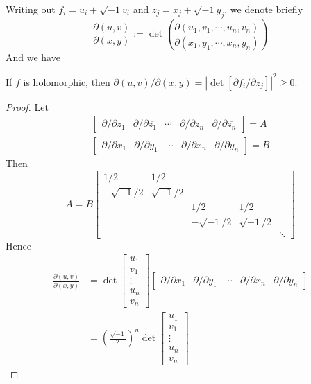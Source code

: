 Writing out $f_i=u_i+\sqrt{-1}v_i$ and $z_j=x_j+\sqrt{-1}y_j$, we denote briefly
\[\frac{\partial(u,v)}{\partial(x,y)}:=\det\left(\frac{\partial(u_1,v_1,\cdots,u_n,v_n)}{\partial(x_1,y_1,\cdots,x_n,y_n)}\right)\]
And we have
\begin{lem}\label{real jacobian}
    If $f$ is holomorphic, then $\partial(u,v)/\partial(x,y)=|\det[\partial{f_i}/\partial{z_j}]|^2\geq 0$.
\end{lem}
\begin{proof}
    Let
    \begin{gather*}
        \begin{bmatrix}
            \partial/\partial{z_1} & \partial/\partial{\overline{z_1}} & \cdots & \partial/\partial{z_n} & \partial/\partial{\overline{z_n}}
        \end{bmatrix}=A\\
        \begin{bmatrix}
            \partial/\partial{x_1} & \partial/\partial{y_1} & \cdots & \partial/\partial{x_n} & \partial/\partial{y_n}
        \end{bmatrix}=B
    \end{gather*}
    Then
    \[A=B\begin{bmatrix}
        1/2 & 1/2 & & & \\
        -\sqrt{-1}/2 & \sqrt{-1}/2 & & & \\
         & & 1/2 & 1/2 & \\
         & & -\sqrt{-1}/2 & \sqrt{-1}/2 & \\
         & & & & \ddots
    \end{bmatrix}\]
    Hence
    \begin{align*}
        \frac{\partial(u,v)}{\partial(x,y)}&=\det\begin{bmatrix}
            u_1 \\ v_1 \\ \vdots \\ u_n \\ v_n
        \end{bmatrix}\begin{bmatrix}
            \partial/\partial{x_1} & \partial/\partial{y_1} & \cdots & \partial/\partial{x_n} & \partial/\partial{y_n}
        \end{bmatrix}\\
        &=\left(\frac{\sqrt{-1}}{2}\right)^n\det\begin{bmatrix}
            u_1 \\ v_1 \\ \vdots \\ u_n \\ v_n

\end{bmatrix}
\end{align*}
\end{proof}
